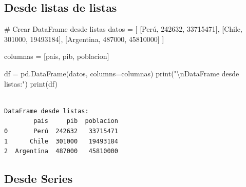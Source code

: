 \documentclass[
  doc,
  floatsintext,
  longtable,
  a4paper,
  nolmodern,
  notxfonts,
  notimes,
  12pt,
  colorlinks=true,linkcolor=blue,citecolor=blue,urlcolor=blue]{apa7}
\newenvironment{Shaded}{\begin{snugshade}}{\end{snugshade}}
\newcommand{\BuiltInTok}[1]{\textcolor[rgb]{0.00,0.23,0.31}{#1}}
\newcommand{\CharTok}[1]{\textcolor[rgb]{0.13,0.47,0.30}{#1}}
\newcommand{\CommentTok}[1]{\textcolor[rgb]{0.37,0.37,0.37}{#1}}
\newcommand{\DecValTok}[1]{\textcolor[rgb]{0.68,0.00,0.00}{#1}}
\newcommand{\NormalTok}[1]{\textcolor[rgb]{0.00,0.23,0.31}{#1}}
\newcommand{\OperatorTok}[1]{\textcolor[rgb]{0.37,0.37,0.37}{#1}}
\newcommand{\StringTok}[1]{\textcolor[rgb]{0.13,0.47,0.30}{#1}}
\begin{document}
\subsection{Desde listas de listas}\label{desde-listas-de-listas}

\begin{Shaded}
\begin{Highlighting}[]
\CommentTok{\# Crear DataFrame desde listas}
\NormalTok{datos }\OperatorTok{=}\NormalTok{ [}
\NormalTok{    [}\StringTok{\textquotesingle{}Perú\textquotesingle{}}\NormalTok{, }\DecValTok{242632}\NormalTok{, }\DecValTok{33715471}\NormalTok{],}
\NormalTok{    [}\StringTok{\textquotesingle{}Chile\textquotesingle{}}\NormalTok{, }\DecValTok{301000}\NormalTok{, }\DecValTok{19493184}\NormalTok{],}
\NormalTok{    [}\StringTok{\textquotesingle{}Argentina\textquotesingle{}}\NormalTok{, }\DecValTok{487000}\NormalTok{, }\DecValTok{45810000}\NormalTok{]}
\NormalTok{]}

\NormalTok{columnas }\OperatorTok{=}\NormalTok{ [}\StringTok{\textquotesingle{}pais\textquotesingle{}}\NormalTok{, }\StringTok{\textquotesingle{}pib\textquotesingle{}}\NormalTok{, }\StringTok{\textquotesingle{}poblacion\textquotesingle{}}\NormalTok{]}

\NormalTok{df }\OperatorTok{=}\NormalTok{ pd.DataFrame(datos, columns}\OperatorTok{=}\NormalTok{columnas)}
\BuiltInTok{print}\NormalTok{(}\StringTok{"}\CharTok{\textbackslash{}n}\StringTok{DataFrame desde listas:"}\NormalTok{)}
\BuiltInTok{print}\NormalTok{(df)}
\end{Highlighting}
\end{Shaded}

\begin{verbatim}

DataFrame desde listas:
        pais     pib  poblacion
0       Perú  242632   33715471
1      Chile  301000   19493184
2  Argentina  487000   45810000
\end{verbatim}

\subsection{Desde Series}\label{desde-series}
\end{document}
